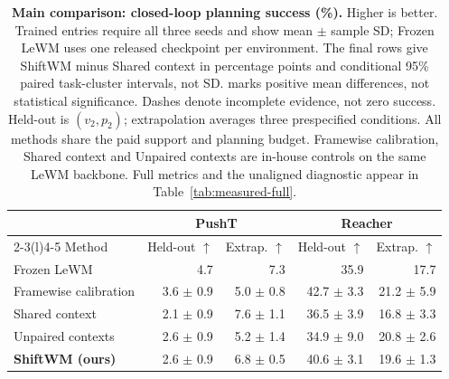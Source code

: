 \begin{table}[t]\centering\small
\providecommand{\ShiftWMPlanningGainRows}{}
\setlength{\tabcolsep}{5pt}\renewcommand{\arraystretch}{1.12}
\begin{tabular}{lrrrr}\toprule
& \multicolumn{2}{c}{PushT} & \multicolumn{2}{c}{Reacher}\\
\cmidrule(lr){2-3}\cmidrule(l){4-5}
Method & Held-out $\uparrow$ & Extrap. $\uparrow$ & Held-out $\uparrow$ & Extrap. $\uparrow$\\\midrule
Frozen LeWM & 4.7 & 7.3 & 35.9 & 17.7\\
Framewise calibration & 3.6 $\pm$ 0.9 & 5.0 $\pm$ 0.8 & 42.7 $\pm$ 3.3 & 21.2 $\pm$ 5.9\\
Shared context & 2.1 $\pm$ 0.9 & 7.6 $\pm$ 1.1 & 36.5 $\pm$ 3.9 & 16.8 $\pm$ 3.3\\
Unpaired contexts & 2.6 $\pm$ 0.9 & 5.2 $\pm$ 1.4 & 34.9 $\pm$ 9.0 & 20.8 $\pm$ 2.6\\
\addlinespace[2pt]
\rowcolor{orange!9}
\textbf{ShiftWM (ours)} & 2.6 $\pm$ 0.9 & 6.8 $\pm$ 0.5 & 40.6 $\pm$ 3.1 & 19.6 $\pm$ 1.3\\
\ShiftWMPlanningGainRows
\bottomrule\end{tabular}
\caption{\textbf{Main comparison: closed-loop planning success (\%).} Higher is better. Trained entries require all three seeds and show mean $\pm$ sample SD; Frozen LeWM uses one released checkpoint per environment. The final rows give ShiftWM minus Shared context in percentage points and conditional 95\% paired task-cluster intervals, not SD.  marks positive mean differences, not statistical significance. Dashes denote incomplete evidence, not zero success. Held-out is $(v_2,p_2)$; extrapolation averages three prespecified conditions. All methods share the paid support and planning budget. Framewise calibration, Shared context and Unpaired contexts are in-house controls on the same LeWM backbone. Full metrics and the unaligned diagnostic appear in Table~\ref{tab:measured-full}.}
\label{tab:measured-primary}\label{tab:primary}\end{table}

